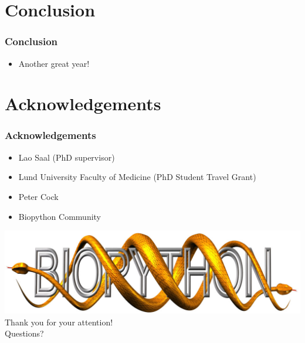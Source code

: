 \documentclass[trans]{beamer}
\begin{document}
\section{Conclusion}
\frame
{
  \frametitle{Conclusion}

  \begin{itemize}
  \item Another great year!
  \end{itemize}
}

\section*{Acknowledgements}
\frame
{
  \frametitle{Acknowledgements}

  \begin{itemize}
  \item Lao Saal (PhD supervisor)
  \item Lund University Faculty of Medicine (PhD Student Travel Grant)
  \item Peter Cock
  \item Biopython Community
  \end{itemize}
}

\frame
{
  \begin{center}
  \includegraphics[height=.2\textheight]{../abstract/biopython.jpg}\\
   {\Huge Thank you for your attention!\\}  
  \vspace{1cm}
  {\Huge Questions?}  
  \end{center}
}
\end{document}

